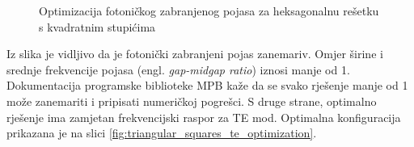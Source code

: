 \documentclass[utf8, seminar, numeric]{fer}
\begin{document}
\begin{figure}[ht]
\centering
    \qquad
	\caption{Optimizacija fotoničkog zabranjenog pojasa za heksagonalnu rešetku s
	kvadratnim stupićima}
	\label{fig:triangular_squares_optimization}
\end{figure}

Iz slika je vidljivo da je fotonički zabranjeni pojas zanemariv. Omjer širine i
srednje frekvencije pojasa (engl. \textit{gap-midgap ratio}) iznosi manje od 1.
Dokumentacija programske biblioteke MPB kaže da se svako rješenje manje od 1 može
zanemariti i pripisati numeričkoj pogrešci. S druge strane, optimalno rješenje ima
zamjetan frekvencijski raspor za TE mod. Optimalna konfiguracija prikazana 
je na slici \ref{fig:triangular_squares_te_optimization}.
\end{document}
